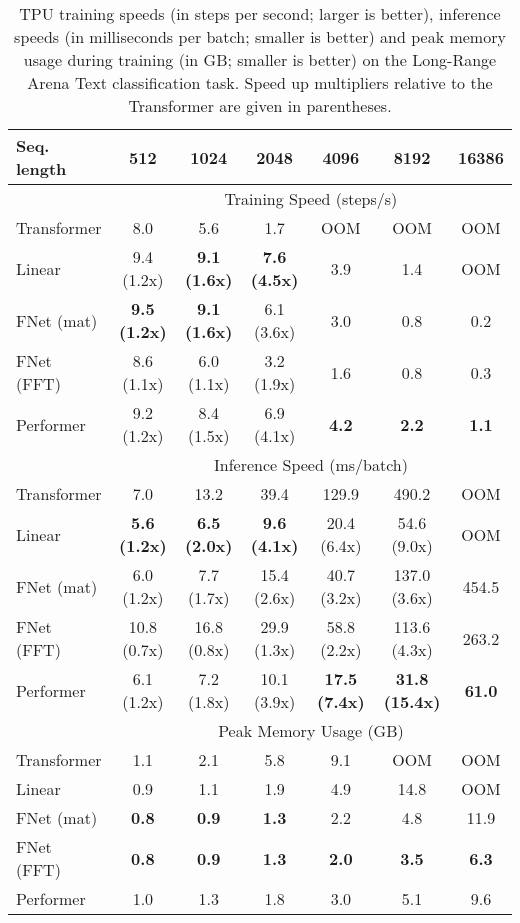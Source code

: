 \documentclass[11pt]{article}
\begin{document}
\begin{table*}
    \caption{TPU training speeds (in steps per second; larger is better), inference speeds (in milliseconds per batch; smaller is better) and peak memory usage during training (in GB; smaller is better) on the Long-Range Arena Text classification task. Speed up multipliers relative to the Transformer are given in parentheses.}
    \label{tab:lra_training_speed_tpu}
    \centering
    \begin{tabular}{l | c c c c c c}
        \hline
         Seq. length & 512 & 1024 & 2048 & 4096 & 8192 & 16386  \\ \hline \hline
         & \multicolumn{6}{c}{Training Speed (steps/s)} \\ \hline
         Transformer & 8.0 & 5.6 & 1.7 & OOM & OOM & OOM \\
         Linear & 9.4 (1.2x) & \textbf{9.1 (1.6x)} & \textbf{7.6 (4.5x)} & 3.9 & 1.4 & OOM \\
         FNet (mat) & \textbf{9.5 (1.2x)} & \textbf{9.1 (1.6x)} & 6.1 (3.6x) & 3.0 & 0.8 & 0.2 \\
         FNet (FFT) & 8.6 (1.1x) & 6.0 (1.1x) & 3.2 (1.9x) & 1.6  & 0.8 & 0.3 \\
         Performer & 9.2 (1.2x) & 8.4 (1.5x) & 6.9 (4.1x) & \textbf{4.2} & \textbf{2.2} & \textbf{1.1} \\ \hline
         & \multicolumn{6}{c}{Inference Speed (ms/batch)} \\ \hline
         Transformer & 7.0 & 13.2 & 39.4 & 129.9 & 490.2 & OOM \\
         Linear & \textbf{5.6 (1.2x)} & \textbf{6.5 (2.0x)} & \textbf{9.6 (4.1x)} & 20.4 (6.4x) & 54.6 (9.0x) & OOM \\
         FNet (mat) & 6.0 (1.2x) & 7.7 (1.7x) & 15.4 (2.6x) & 40.7 (3.2x) & 137.0 (3.6x) & 454.5 \\
         FNet (FFT) & 10.8 (0.7x) & 16.8 (0.8x) & 29.9 (1.3x) & 58.8 (2.2x) & 113.6 (4.3x) & 263.2 \\
         Performer & 6.1 (1.2x) & 7.2 (1.8x) & 10.1 (3.9x) & \textbf{17.5 (7.4x)} & \textbf{31.8 (15.4x)} & \textbf{61.0} \\ \hline
         & \multicolumn{6}{c}{Peak Memory Usage (GB)} \\ \hline
         Transformer & 1.1 & 2.1 & 5.8 & 9.1 & OOM & OOM \\
         Linear & 0.9 & 1.1 & 1.9 & 4.9 & 14.8 & OOM \\
         FNet (mat) & \textbf{0.8} & \textbf{0.9} & \textbf{1.3} & 2.2 & 4.8 & 11.9 \\
         FNet (FFT) & \textbf{0.8} & \textbf{0.9} & \textbf{1.3} & \textbf{2.0} & \textbf{3.5} & \textbf{6.3} \\
         Performer & 1.0 & 1.3 & 1.8 & 3.0 & 5.1 & 9.6 \\ \hline
    \end{tabular}
\end{table*}
\end{document}
